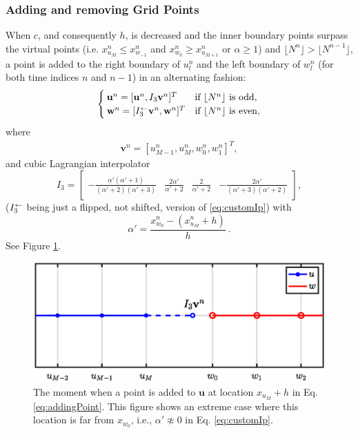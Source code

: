 \subsubsection{Adding and removing Grid Points}
When $c$, and consequently $h$, is decreased and the inner boundary points surpass the virtual points (i.e. $x_{u_M}^n \leq x_{w_{-1}}^n$ and $x_{w_0}^n \geq x_{u_{M+1}}^n$ or $
\alpha \geq 1$) and $\lfloor N^n\rfloor > \lfloor N^{n-1}\rfloor$, a point is added to the right boundary of $u_l^n$ and the left boundary of $w_l^n$ (for both time indices $n$ and $n-1$) in an alternating fashion: 
\begin{equation}\label{eq:addingPoint}
        \begin{cases}\mathbf{u}^n = [\mathbf{u}^n, I_3\mathbf{v}^n]^T & \text{if $\lfloor N^n\rfloor $ is odd},\\
        \mathbf{w}^n = [I_3^\leftarrow\mathbf{v}^n, \mathbf{w}^n]^T & \text{if $\lfloor N^n\rfloor$ is even},
        \end{cases}
\end{equation}
where 
\begin{align*}
\mathbf{v}^n = [u_{M-1}^n, u_M^n, w_0^n, w_1^n]^T,%
\end{align*}
and cubic Lagrangian interpolator
\begin{equation}\label{eq:customIp}
    I_3 = \begin{bmatrix} -\frac{\alpha'(\alpha'+1)}{(\alpha'+2)(\alpha'+3)} &\frac{2\alpha'}{\alpha'+2} &\frac{2}{\alpha'+2} 
    &-\frac{2\alpha'}{(\alpha'+3)(\alpha'+2)}
    \end{bmatrix},
\end{equation}
($I_3^\leftarrow$ being just a flipped, not shifted, version of \eqref{eq:customIp}) with
\begin{equation*}
    \alpha' = \frac{x_{w_0}^n - (x_{u_M}^n + h)}{h}\ .
\end{equation*}
See Figure \ref{fig:addingPoint}.

\begin{figure}[ht]
    \centering
\includegraphics[width=\figwidth\columnwidth]{Figures/addingGridPoint4.eps}
\caption{\label{fig:addingPoint}{The moment when a point is added to $\mathbf{u}$ at location $x_{u_M} + h$ in Eq. \eqref{eq:addingPoint}. This figure shows an extreme case where this location is far from $x_{w_0}$, i.e., $\alpha' \not\approx 0$ in Eq. \eqref{eq:customIp}.}}
\end{figure}

